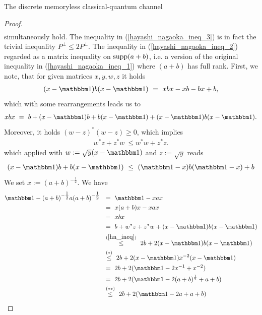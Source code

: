 \begin{section}{The discrete memoryless  classical-quantum channel}
\begin{proof}
\begin{align}
        \end{align}       
        simultaneously hold. The inequality in (\ref{hayashi_nagaoka_ineq_3}) is in fact the trivial inequality $P^\perp \leq 2P^{\perp}$. 
        The inequality in (\ref{hayashi_nagaoka_ineq_2}) regarded as a matrix inequality on $\mathrm{supp}(a+b)$, i.e. a version of the original inequality in (\ref{hayashi_nagaoka_ineq_1}) where $(a+b)$ has full rank. \newline   
        First, we note, that for given matrices $x,y,w,z$ it holds
        \begin{align*}
         (x-\bbmeins)b(x - \bbmeins) \ = \ xbx - xb -bx + b, 
        \end{align*}
        which with some rearrangements leads us to 
        \begin{align*}
         xbx \ = \ b + (x-\bbmeins)b + b(x - \bbmeins) + (x - \bbmeins)b(x - \bbmeins). 
        \end{align*}
        Moreover, it holds $(w-z)^\ast (w-z) \geq 0$, which implies 
        \begin{align*}
         w^\ast z + z^\ast w \ \leq w^\ast w + z^\ast z.
        \end{align*}
        which applied with $w := \sqrt{y}(x-\bbmeins)$ and $z := \sqrt{y}$ reads 
        \begin{align}
         (x-\bbmeins)b + b(x-\bbmeins) \ \leq \  (\bbmeins - x)b(\bbmeins -x) + b \label{hn_ineq}
        \end{align}
        We set $x := (a+b)^{-\tfrac{1}{2}}$. We have   
        \begin{align*}
         \bbmeins - (a+b)^{-\tfrac{1}{2}} a (a+b)^{-\tfrac{1}{2}}  \ 
         & \ =	\	 \bbmeins - xax \\
         & \ =	\	 x(a+b)x - xax \\
         & \ =	\	 xbx \\
         & \ =	\	 b + w^\ast z + z^\ast w + (x-\bbmeins) b (x - \bbmeins) \\
         & \ \overset{(\ref{hn_ineq})}{\leq}\	 2b + 2(x - \bbmeins) b (x - \bbmeins) \\
         & \ \overset{(*)}{\leq} \	 2b + 2(x-\bbmeins)x^{-2}(x-\bbmeins) \\
         & \ = 	\	 2b + 2(\bbmeins - 2x^{-1} + x^{-2}) \\
         & \ = 	\	 2b + 2(\bbmeins - 2 (a+b)^\frac{1}{2} + a + b) \\
         & \ \overset{(**)}{\leq} \	 2b + 2(\bbmeins - 2 a + a + b) \\

\end{align*}
\end{proof}
\end{section}

